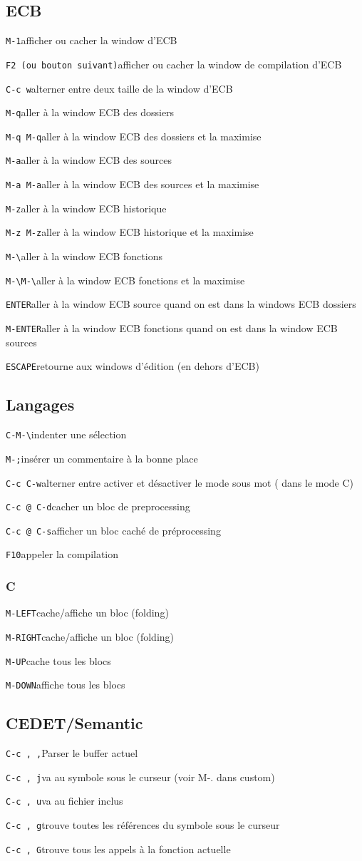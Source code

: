 \documentclass[10pt,landscape]{article}
\def\cm#1#2{{\tt#1}\dotfill#2\par}
\begin{document}
\begin{multicols}{3}
\subsection{ECB}
\cm{M-1}{afficher ou cacher la window d'ECB}
\cm{F2 (ou bouton suivant)}{afficher ou cacher la window de compilation d'ECB}
\cm{C-c w}{alterner entre deux taille de la window d'ECB}
\cm{M-q}{aller à la window ECB des dossiers}
\cm{M-q M-q}{aller à la window ECB des dossiers et la maximise}
\cm{M-a}{aller à la window ECB des sources}
\cm{M-a M-a}{aller à la window ECB des sources et la maximise}
\cm{M-z}{aller à la window ECB historique}
\cm{M-z M-z}{aller à la window ECB historique et la maximise}
\cm{M-\textbackslash}{aller à la window ECB fonctions}
\cm{M-\textbackslash M-\textbackslash}{aller à la window ECB fonctions et la maximise}
\cm{ENTER}{aller à la window ECB source quand on est dans la windows ECB dossiers}
\cm{M-ENTER}{aller à la window ECB fonctions quand on est dans la window ECB sources}
\cm{ESCAPE}{retourne aux windows d'édition (en dehors d'ECB)}





\subsection{Langages}
\cm{C-M-\textbackslash}{indenter une sélection}
\cm{M-;}{insérer un commentaire à la bonne place}
\cm{C-c C-w}{alterner entre activer et désactiver le mode sous mot ( dans le mode C)}
\cm{C-c @ C-d}{cacher un bloc de preprocessing}
\cm{C-c @ C-s}{afficher un bloc caché de préprocessing}
\cm{F10}{appeler la compilation}

\subsubsection{C}
\cm{M-LEFT}{cache/affiche un bloc (folding)}
\cm{M-RIGHT}{cache/affiche un bloc (folding)}
\cm{M-UP}{cache tous les blocs}
\cm{M-DOWN}{affiche tous les blocs}





\subsection{CEDET/Semantic}
\cm{C-c , ,}{Parser le buffer actuel}
\cm{C-c , j}{va au symbole sous le curseur (voir M-. dans custom)}
\cm{C-c , u}{va au fichier inclus}
\cm{C-c , g}{trouve toutes les références du symbole sous le curseur}
\cm{C-c , G}{trouve tous les appels à la fonction actuelle}






\end{multicols}
\end{document}
